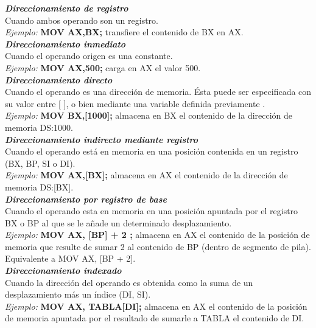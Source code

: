 \documentclass[12pt,a4paper]{article}
\begin{document}
   \textbf{\textit{Direccionamiento de registro}}\\
   Cuando ambos operando son un registro.\\
   \textit{Ejemplo:}
   \hspace{1cm} \textbf{MOV AX,BX;} transfiere el contenido de BX en AX.\\ 
   
   \textbf{\textit{Direccionamiento inmediato}}\\
   Cuando el operando origen es una constante.\\
   \textit{Ejemplo:}
   \hspace{1cm} \textbf{MOV AX,500;} carga en AX el valor 500.\\ 
    
    \textbf{\textit{Direccionamiento directo}}\\
  Cuando el operando es una dirección de memoria. Ésta puede ser especificada con su valor entre [ ], o bien mediante una variable definida previamente .\\
   \textit{Ejemplo:}
   \hspace{1cm} \textbf{MOV BX,[1000];} almacena en BX el contenido de la dirección de
memoria DS:1000.\\ 

\textbf{\textit{Direccionamiento indirecto mediante registro}}\\
  Cuando el operando está en memoria en una posición contenida en un registro (BX, BP, SI o DI). \\
   \textit{Ejemplo:}
   \hspace{1cm} \textbf{MOV AX,[BX];} almacena en AX el contenido de la dirección de memoria DS:[BX]. \\   
   
   \textbf{\textit{Direccionamiento por registro de base}}\\
  Cuando el operando esta en memoria en una posición apuntada por el registro BX o BP al que se le añade un determinado desplazamiento. \\
   \textit{Ejemplo:}
   \hspace{1cm} \textbf{MOV AX, [BP] + 2 ;} almacena en AX el contenido de la posición de memoria que resulte de sumar 2 al contenido de BP (dentro de segmento de pila). Equivalente a MOV AX, [BP + 2]. \\   
   
   \textbf{\textit{Direccionamiento indexado}}\\
  Cuando la dirección del operando es obtenida como la suma de un desplazamiento más un índice (DI, SI). \\
   \textit{Ejemplo:}
   \hspace{1cm} \textbf{MOV AX, TABLA[DI];} almacena en AX el contenido de la posición de memoria apuntada por el resultado de sumarle a TABLA el contenido de DI. \\   
   
\end{document}

